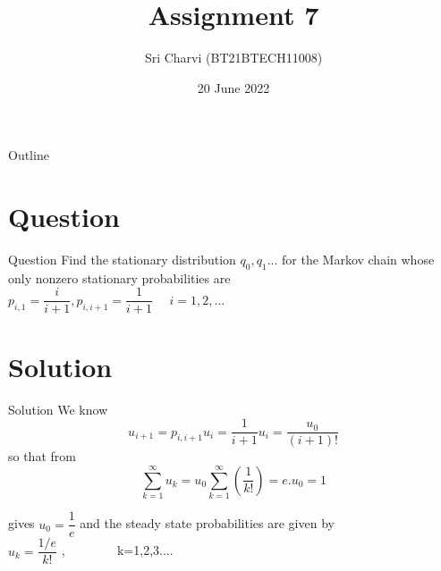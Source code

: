\documentclass{beamer}
\title{Assignment 7}
\author{Sri Charvi (BT21BTECH11008)}
\date{20 June 2022}
\begin{document}
	
	\begin{frame}
		\titlepage 
	\end{frame}
	
	\logo{}
	
	
	\begin{frame}{Outline}
		\tableofcontents
	\end{frame}
	
	\section{Question}
	\begin{frame}{Question}
	Find the stationary distribution $ q_{0},q_{1} $... for the Markov chain whose only nonzero stationary probabilities are \\
	$ p_{i,1}=\dfrac{i}{i+1} , p_{i,i+1}=\dfrac{1}{i+1}~~~~~~ i=1,2,...$
	\end{frame}
	
	
	\section{Solution}
	\begin{frame}{Solution}
	We know\\
\begin{equation}
	u_{i+1}=p_{i,i+1}u_{i}=\dfrac{1}{i+1}u_{i}=\dfrac{u_{0}}{(i+1)!}
\end{equation}
so that from \\
\begin{equation}
	\sum_{k=1}^{\infty}u_{k}=u_{0}\sum_{k=1}^{\infty}(\dfrac{1}{k!})=e.u_{0}=1
\end{equation}

	  
	\end{frame} 
	\begin{frame}
		gives $ u_{0}=\dfrac{1}{e} $ and the steady state probabilities are given by\\
		$ u_{k}=\dfrac{1/e}{k!} $ , ~~~~~~~ k=1,2,3....
		
	\end{frame}
	
\end{document}
